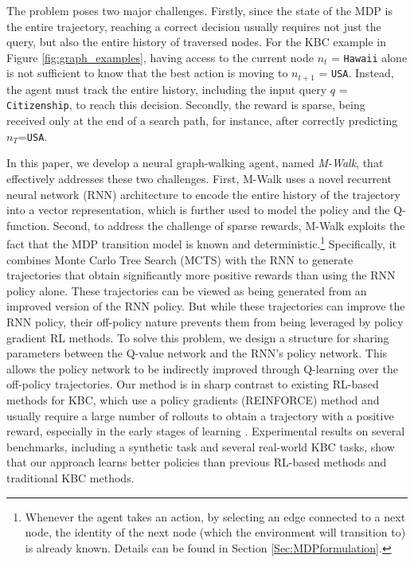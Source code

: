 \documentclass{article}
\newcommand{\modelname}{M-Walk}
\begin{document}
	The problem poses two major challenges. Firstly, since the state of the MDP is the entire trajectory, reaching a correct decision usually requires not just the query, but also the entire history of traversed nodes. For the KBC example in Figure \ref{fig:graph_examples}, having access to the current node $n_t$ = \texttt{Hawaii} alone is not sufficient to know that the best action is moving to $n_{t+1}$ = \texttt{USA}. Instead, the agent must track the entire history, including the input query $q$ = \texttt{Citizenship}, to reach this decision. Secondly, the reward is sparse, being received only at the end of a search path, for instance, after correctly predicting $n_T$=\texttt{USA}. 
	
	In this paper, we develop a neural graph-walking agent, named \emph{\modelname}, that effectively addresses these two challenges. First, M-Walk uses a novel recurrent neural network (RNN) architecture to encode the entire history of the trajectory into a vector representation, which is further used to model the policy and the Q-function. Second, to address the challenge of sparse rewards, M-Walk exploits the fact that the MDP transition model is known and deterministic.\footnote{Whenever the agent takes an action, by selecting an edge connected to a next node, the identity of the next node (which the environment will transition to) is already known. Details can be found in Section \ref{Sec:MDPformulation}.} Specifically, it combines Monte Carlo Tree Search (MCTS) with the RNN to generate trajectories that obtain significantly more positive rewards than using the RNN policy alone. These trajectories can be viewed as being generated from an improved version of the RNN policy. But while these trajectories can improve the RNN policy, their off-policy nature prevents them from being leveraged by policy gradient RL methods. To solve this problem, we design a structure for sharing parameters between the Q-value network and the RNN's policy network. This allows the policy network to be indirectly improved through Q-learning over the off-policy trajectories. Our method is in sharp contrast to existing RL-based methods for KBC, which use a policy gradients (REINFORCE) method \cite{williams1992simple} and usually require a large number of rollouts to obtain a trajectory with a positive reward, especially in the early stages of learning \cite{gu2016q,wu2017scalable,kakade2002natural}. Experimental results on several benchmarks, including a synthetic task and several real-world KBC tasks, show that our approach learns better policies than previous RL-based methods and traditional KBC methods.
\end{document}
